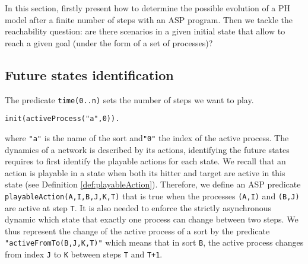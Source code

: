 
In this section, firstly present how to determine the possible evolution of a PH model after a finite number of steps with an ASP program.
Then we tackle the reachability question: are there scenarios in a given initial state
that allow to reach a given goal (under the form of a set of processes)?

\subsection{Future states identification}
%
The predicate \texttt{time(0..n)} sets the number of steps we want to play.
%
\begin{lstlisting}
init(activeProcess("a",0)).
\end{lstlisting}
where \texttt{"a"} is the name of the sort and\texttt{"0"} the index of the active process.
The dynamics of a network is described by its actions,
identifying the future states requires to first identify the playable actions for each state.
We recall that an action is playable in a state when both its hitter and target are active in this state (see Definition \ref{def:playableAction}).
Therefore, we define an ASP predicate \texttt{playableAction(A,I,B,J,K,T)} that is true
when the processes \texttt{(A,I)} and \texttt{(B,J)} are active at step \texttt{T}.
It is also needed to enforce the strictly asynchronous dynamic
which state that exactly one process can change between two steps.
We thus represent the change of the active process of a sort
by the predicate \texttt{"activeFromTo(B,J,K,T)"}
which means that in sort \texttt{B}, the active process changes from index \texttt{J} to \texttt{K} between steps \texttt{T} and \texttt{T+1}.
%
